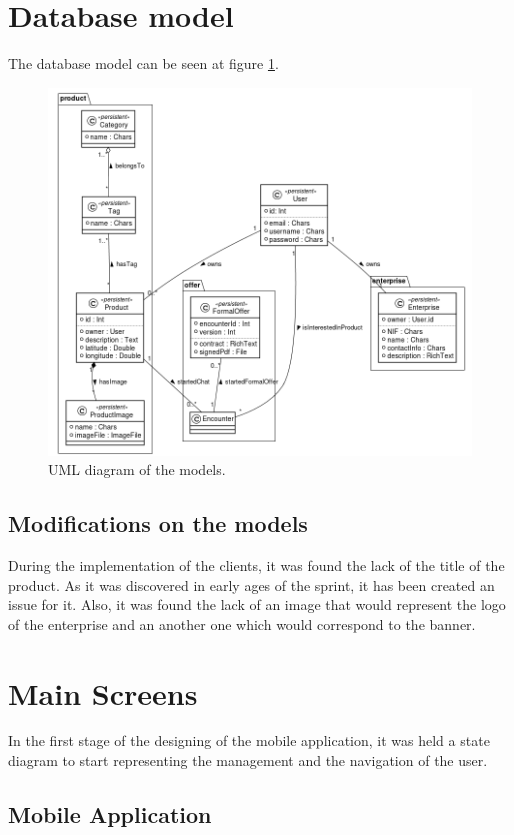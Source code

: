 \documentclass[./main.tex]{subfiles}
\begin{document}
\section{Database model}
The database model can be seen at figure \ref{fig:model-uml}.

\begin{figure}[H]
\centering
\includegraphics[width=\linewidth]{img/database-model.png}
\caption{UML diagram of the models.}
\label{fig:model-uml}
\end{figure}

\subsection{Modifications on the models}
During the implementation of the clients, it was found the lack of the title of the product. As it was discovered in early ages of the sprint, it has been created an issue for it. Also, it was found the lack of an image that would represent the logo of the enterprise and an another one which would correspond to the banner.
\section{Main Screens} \label{sec:views}
In the first stage of the designing of the mobile application, it was held a state diagram to start representing the management and the navigation of the user.
\subsection{Mobile Application}
\end{document}
